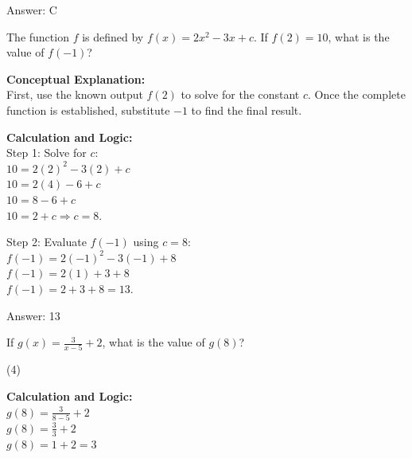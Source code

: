 \documentclass[11pt,paper=a4,answers]{exam}
\begin{document}
\begin{questions}
\begin{solution}
Answer: \colorbox{yellow!100}{C}
\end{solution}


\question
The function $f$ is defined by $f(x) = 2x^2 - 3x + c$. If $f(2) = 10$, what is the value of $f(-1)$?

\begin{solution}
\textbf{Conceptual Explanation:} \\
First, use the known output $f(2)$ to solve for the constant $c$. Once the complete function is established, substitute $-1$ to find the final result.

\vspace{30pt}

\textbf{Calculation and Logic:} \\
Step 1: Solve for $c$: \\
$10 = 2(2)^2 - 3(2) + c$ \\
$10 = 2(4) - 6 + c$ \\
$10 = 8 - 6 + c$ \\
$10 = 2 + c \Rightarrow c = 8$.

\vspace{15pt}

Step 2: Evaluate $f(-1)$ using $c = 8$: \\
$f(-1) = 2(-1)^2 - 3(-1) + 8$ \\
$f(-1) = 2(1) + 3 + 8$ \\
$f(-1) = 2 + 3 + 8 = 13$.

\vspace{30pt}

Answer: \colorbox{yellow!100}{13}
\end{solution}

\vspace{40pt}

\question
If $g(x) = \frac{3}{x-5} + 2$, what is the value of $g(8)$?
\begin{tasks}(4)
\end{tasks}

\begin{solution}
\textbf{Calculation and Logic:} \\
$g(8) = \frac{3}{8-5} + 2$ \\
$g(8) = \frac{3}{3} + 2$ \\
$g(8) = 1 + 2 = 3$


\end{solution}
\end{questions}
\end{document}
